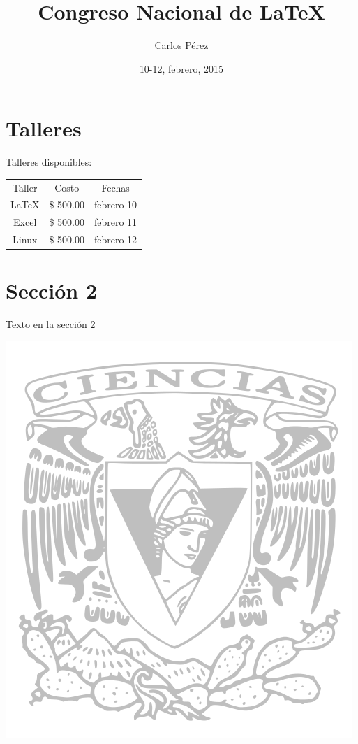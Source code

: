 \documentclass[10pt, notumble, letterpaper]{leaflet}
\title{Congreso Nacional de \LaTeX}
\author{Carlos Pérez}
\date{10-12, febrero, 2015}
\begin{document}
\pagecolor{yellow}

\maketitle

\thispagestyle{empty}

\section{Talleres}

Talleres disponibles:

\begin{table}[h!]
\begin{tabular}{ccc}
 Taller & Costo & Fechas \\
 \LaTeX{} & \$ 500.00 & febrero 10 \\
 Excel & \$ 500.00 & febrero 11 \\
 Linux & \$ 500.00 & febrero 12
\end{tabular}
\end{table}

\newpage
\pagecolor{white}%

\section{Sección 2}

Texto en la sección 2
\begin{center}
\includegraphics[scale=0.2]{escudoCiencias}
\end{center}
\end{document}
